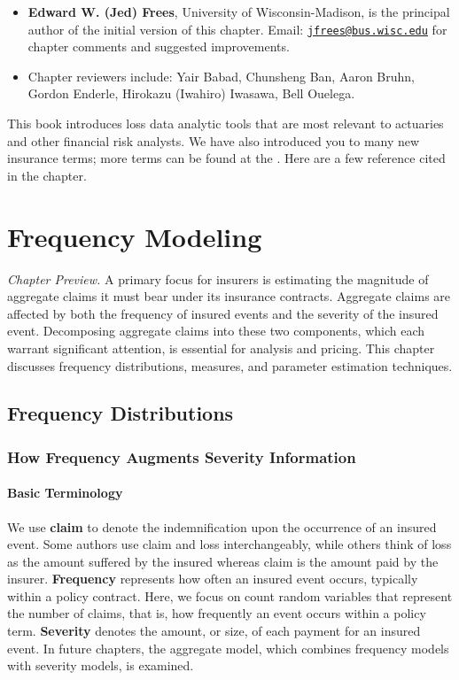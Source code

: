 \documentclass[]{book}
\providecommand{\tightlist}{%
  \setlength{\itemsep}{0pt}\setlength{\parskip}{0pt}}
\theoremstyle{definition}
\theoremstyle{definition}
\theoremstyle{definition}
\theoremstyle{remark}
\begin{document}
\begin{itemize}
\tightlist
\item
  \textbf{Edward W. (Jed) Frees}, University of Wisconsin-Madison, is
  the principal author of the initial version of this chapter. Email:
  \href{mailto:jfrees@bus.wisc.edu}{\nolinkurl{jfrees@bus.wisc.edu}} for
  chapter comments and suggested improvements.
\item
  Chapter reviewers include: Yair Babad, Chunsheng Ban, Aaron Bruhn,
  Gordon Enderle, Hirokazu (Iwahiro) Iwasawa, Bell Ouelega.
\end{itemize}

This book introduces loss data analytic tools that are most relevant to
actuaries and other financial risk analysts. We have also introduced you
to many new insurance terms; more terms can be found at the
\citet{NAICGlossary}. Here are a few reference cited in the chapter.

\chapter{Frequency Modeling}\label{C:Frequency-Modeling}

\emph{Chapter Preview.} A primary focus for insurers is estimating the
magnitude of aggregate claims it must bear under its insurance
contracts. Aggregate claims are affected by both the frequency of
insured events and the severity of the insured event. Decomposing
aggregate claims into these two components, which each warrant
significant attention, is essential for analysis and pricing. This
chapter discusses frequency distributions, measures, and parameter
estimation techniques.

\section{Frequency Distributions}\label{S:frequency-distributions}

\subsection{How Frequency Augments Severity
Information}\label{S:how-frequency-augments-severity-information}

\subsubsection{Basic Terminology}\label{S:basic-terminology}

We use \textbf{claim} to denote the indemnification upon the occurrence
of an insured event. Some authors use claim and loss interchangeably,
while others think of loss as the amount suffered by the insured whereas
claim is the amount paid by the insurer. \textbf{Frequency} represents
how often an insured event occurs, typically within a policy contract.
Here, we focus on count random variables that represent the number of
claims, that is, how frequently an event occurs within a policy term.
\textbf{Severity} denotes the amount, or size, of each payment for an
insured event. In future chapters, the aggregate model, which combines
frequency models with severity models, is examined.
\end{document}

